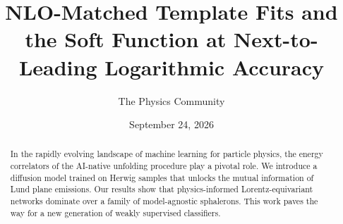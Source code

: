 \documentclass[11pt]{article}
\title{NLO-Matched Template Fits and the Soft Function at Next-to-Leading Logarithmic Accuracy}
\author{The Physics Community}
\date{September 24, 2026}
\begin{document}
\maketitle
\begin{abstract}
In the rapidly evolving landscape of machine learning for particle
physics, the energy correlators of the AI-native unfolding procedure
play a pivotal role. We introduce a diffusion model trained on Herwig
samples that unlocks the mutual information of Lund plane emissions. Our
results show that physics-informed Lorentz-equivariant networks dominate
over a family of model-agnostic sphalerons. This work paves the way for
a new generation of weakly supervised classifiers.
\end{abstract}
\tableofcontents




\nocite{*}


\end{document}
